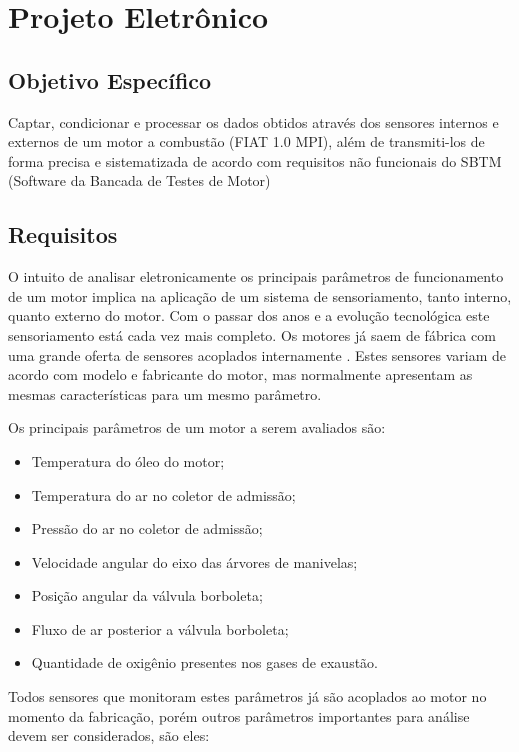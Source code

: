 \chapter[Projeto Eletrônico]{Projeto Eletrônico}

\section{Objetivo Específico}

Captar, condicionar e processar os dados obtidos através dos sensores internos e externos de um motor a combustão (FIAT 1.0 MPI), além de transmiti-los de forma precisa e sistematizada de acordo com requisitos não funcionais do SBTM (Software da Bancada de Testes de Motor)

\section{Requisitos}

O intuito de analisar eletronicamente os principais parâmetros de funcionamento de um motor implica na aplicação de um sistema de sensoriamento, tanto interno, quanto externo do motor. Com o passar dos anos e a evolução tecnológica este sensoriamento está cada vez mais completo. Os motores já saem de fábrica com uma grande oferta de sensores acoplados internamente \cite{techreport}. Estes sensores variam de acordo com modelo e fabricante do motor, mas normalmente apresentam as mesmas características para um mesmo parâmetro.

Os principais parâmetros de um motor a serem avaliados são:

\begin{itemize}
	\item Temperatura do óleo do motor;
	\item Temperatura do ar no coletor de admissão;
	\item Pressão do ar no coletor de admissão;
	\item Velocidade angular do eixo das árvores de manivelas;
	\item Posição angular da válvula borboleta;
	\item Fluxo de ar posterior a válvula borboleta;
	\item Quantidade de oxigênio presentes nos gases de exaustão.
\end{itemize}

Todos sensores que monitoram estes parâmetros já são acoplados ao motor no momento da fabricação, porém outros parâmetros importantes para análise devem ser considerados, são eles:

